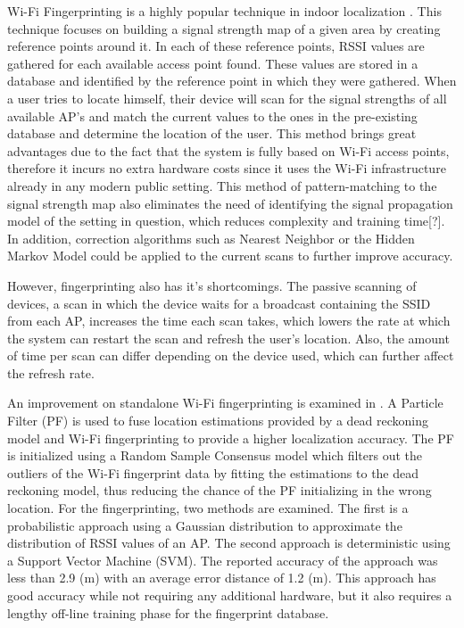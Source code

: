 \documentclass[conference]{IEEEtran}
\begin{document}
Wi-Fi Fingerprinting is a highly popular technique in indoor localization \cite{chan2012indoor}\cite{navarro2010wi}. This technique focuses on  building a signal strength map of a given area by creating reference points around it. In each of these reference points, RSSI values are gathered for each available access point found. These values are stored in a database and identified by the reference point in which they were gathered. When a user tries to locate himself, their device will scan for the signal strengths of all available AP’s and match the current values to the ones in the pre-existing database and determine the location of the user. This method brings great advantages due to the fact that the system is fully based on Wi-Fi access points, therefore it incurs no extra hardware costs since it uses the Wi-Fi infrastructure already in any modern public setting. This method of pattern-matching to the signal strength map also eliminates the need of identifying the signal propagation model of the setting in question, which reduces complexity and training time[?]. In addition, correction algorithms such as Nearest Neighbor or the Hidden Markov Model could be applied to the current scans to further improve accuracy.

However, fingerprinting also has it’s shortcomings. The passive scanning of devices, a scan in which the device waits for a broadcast containing the SSID from each AP, increases the time each scan takes, which lowers the rate at which the system can restart the scan and refresh the user’s location. Also, the amount of time per scan can differ depending on the device used, which can further affect the refresh rate.

An improvement on standalone Wi-Fi fingerprinting is examined in \cite{wu2016improved}.  A Particle Filter (PF) is used to fuse location estimations provided by a dead reckoning model and Wi-Fi fingerprinting to provide a higher localization accuracy. The PF is initialized using a Random Sample Consensus model which filters out the outliers of the Wi-Fi fingerprint data by fitting the estimations to the dead reckoning model, thus reducing the chance of the PF initializing in the wrong location. For the fingerprinting, two methods are examined. The first is a probabilistic approach using a Gaussian distribution to approximate the distribution of RSSI values of an AP. The second approach is deterministic using a Support Vector Machine (SVM).  The reported accuracy of the approach was less than 2.9 (m) with an average error distance of 1.2 (m). This approach has good accuracy while not requiring any additional hardware, but it also requires a lengthy off-line training phase for the fingerprint database.
\end{document}
